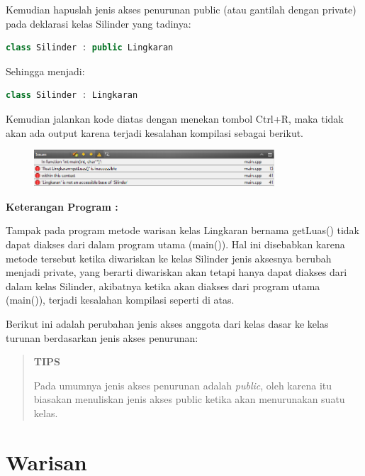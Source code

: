 Kemudian hapuslah jenis akses penurunan public (atau gantilah dengan
private) pada deklarasi kelas Silinder yang tadinya:

\begin{lstlisting}[language=c++]
class Silinder : public Lingkaran
\end{lstlisting}

Sehingga menjadi:

\begin{lstlisting}[language=c++]
class Silinder : Lingkaran
\end{lstlisting}

Kemudian jalankan kode diatas dengan menekan tombol Ctrl+R, maka tidak
akan ada output karena terjadi kesalahan kompilasi sebagai berikut.

\begin{figure}[htbp]
\centering
\includegraphics[width=0.8\textwidth]{images/capture7-1.png}

\end{figure}

\textbf{Keterangan Program :}

Tampak pada program metode warisan kelas Lingkaran bernama getLuas()
tidak dapat diakses dari dalam program utama (main()). Hal ini
disebabkan karena metode tersebut ketika diwariskan ke kelas Silinder
jenis aksesnya berubah menjadi private, yang berarti diwariskan akan
tetapi hanya dapat diakses dari dalam kelas Silinder, akibatnya ketika
akan diakses dari program utama (main()), terjadi kesalahan kompilasi
seperti di atas.

Berikut ini adalah perubahan jenis akses anggota dari kelas dasar ke
kelas turunan berdasarkan jenis akses penurunan:

\begin{quotation}
	\textbf{TIPS} 
	
	Pada
	umumnya jenis akses penurunan adalah \emph{public}, oleh karena itu
	biasakan menuliskan jenis akses public ketika akan menurunakan suatu
	kelas.
\end{quotation}
 

\section{Warisan}\label{warisan}


